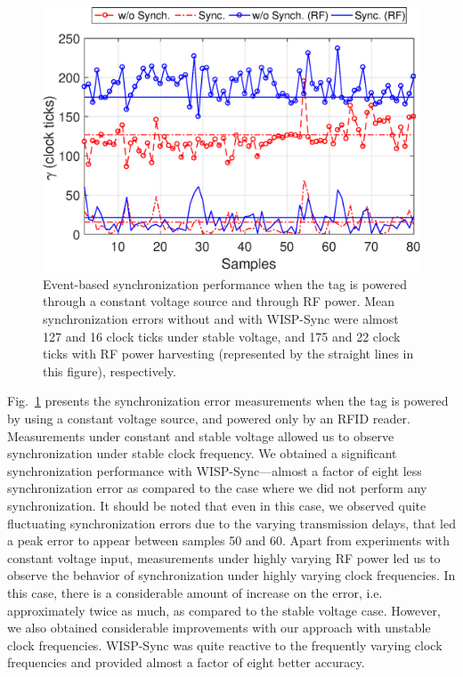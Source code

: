 \documentclass[10pt,journal,compsoc]{IEEEtran}
\begin{document}
\begin{figure}
	\centering
	\includegraphics[width=0.9\columnwidth]{figures/synchronization_accuracy.eps}
	\caption{\label{fig:sync_error}Event-based synchronization performance when the tag is powered through a constant voltage source and through RF power. Mean synchronization errors without and with WISP-Sync were almost 127 and 16 clock ticks under stable voltage, and 175 and 22 clock ticks with RF power harvesting (represented by the straight lines in this figure), respectively.}
\end{figure}

Fig.~\ref{fig:sync_error} presents the synchronization error measurements when the tag is powered by using a constant voltage source, and powered only by an RFID reader. Measurements under constant and stable voltage allowed us to observe synchronization under stable clock frequency. We obtained a significant synchronization performance with WISP-Sync---almost a factor of eight less synchronization error as compared to the case where we did not perform any synchronization. It should be noted that even in this case, we observed quite fluctuating synchronization errors due to the varying transmission delays, that led a peak error to appear between samples 50 and 60. Apart from experiments with constant voltage input, measurements under highly varying RF power led us to observe the behavior of synchronization under highly varying clock frequencies. In this case, there is a considerable amount of increase on the error, i.e. approximately twice as much, as compared to the stable voltage case. However, we also obtained considerable improvements with our approach with unstable clock frequencies. WISP-Sync was quite reactive to the frequently varying clock frequencies and provided almost a factor of eight better accuracy.
\end{document}
